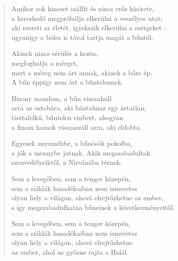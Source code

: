 \begin{verse}
 Amikor sok kincset szállít és nincs erős kísérete,\\
a kereskedő megpróbálja elkerülni a veszélyes utat;\\
aki szereti az életét, igyekszik elkerülni a mérgeket –\\
ugyanígy a bölcs is távol tartja magát a bűntől.

 Akinek nincs sérülés a kezén,\\
megfoghatja a mérget,\\
mert a méreg nem árt annak, akinek a bőre ép.\\
A bűn éppígy nem árt a bűntelennek.

 Bizony mondom, a bűn visszahull\\
arra az ostobára, aki bántalmaz egy ártatlan,\\
tisztalelkű, bűntelen embert, ahogyan\\
a finom homok visszaszáll arra, aki eldobta.

 Egyesek anyaméhbe, a bűnösök pokolba,\\
a jók a mennybe jutnak. Akik megszabadultak\\
szenvedélyeiktől, a Nirvánába térnek.

 Sem a levegőben, sem a tenger közepén,\\
sem a sziklák hasadékaiban nem ismeretes\\
olyan hely a világon, ahová elrejtőzhetne az ember,\\
s így megszabadulhatna bűneinek a következményeitől.

 Sem a levegőben, sem a tenger közepén,\\
sem a sziklák hasadékaiban nem ismeretes\\
olyan hely a világon, ahová elrejtőzhetne\\
az ember, ahol ne győzne rajta a Halál.

\end{verse}

